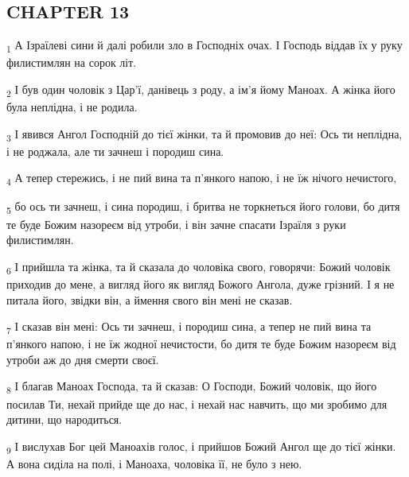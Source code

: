\subsection{CHAPTER 13}
\begin{tcolorbox}
\textsubscript{1} А Ізраїлеві сини й далі робили зло в Господніх очах. І Господь віддав їх у руку филистимлян на сорок літ.
\end{tcolorbox}
\begin{tcolorbox}
\textsubscript{2} І був один чоловік з Цар'ї, данівець з роду, а ім'я йому Маноах. А жінка його була неплідна, і не родила.
\end{tcolorbox}
\begin{tcolorbox}
\textsubscript{3} І явився Ангол Господній до тієї жінки, та й промовив до неї: Ось ти неплідна, і не роджала, але ти зачнеш і породиш сина.
\end{tcolorbox}
\begin{tcolorbox}
\textsubscript{4} А тепер стережись, і не пий вина та п'янкого напою, і не їж нічого нечистого,
\end{tcolorbox}
\begin{tcolorbox}
\textsubscript{5} бо ось ти зачнеш, і сина породиш, і бритва не торкнеться його голови, бо дитя те буде Божим назореєм від утроби, і він зачне спасати Ізраїля з руки филистимлян.
\end{tcolorbox}
\begin{tcolorbox}
\textsubscript{6} І прийшла та жінка, та й сказала до чоловіка свого, говорячи: Божий чоловік приходив до мене, а вигляд його як вигляд Божого Ангола, дуже грізний. І я не питала його, звідки він, а ймення свого він мені не сказав.
\end{tcolorbox}
\begin{tcolorbox}
\textsubscript{7} І сказав він мені: Ось ти зачнеш, і породиш сина, а тепер не пий вина та п'янкого напою, і не їж жодної нечистости, бо дитя те буде Божим назореєм від утроби аж до дня смерти своєї.
\end{tcolorbox}
\begin{tcolorbox}
\textsubscript{8} І благав Маноах Господа, та й сказав: О Господи, Божий чоловік, що його посилав Ти, нехай прийде ще до нас, і нехай нас навчить, що ми зробимо для дитини, що народиться.
\end{tcolorbox}
\begin{tcolorbox}
\textsubscript{9} І вислухав Бог цей Маноахів голос, і прийшов Божий Ангол ще до тієї жінки. А вона сиділа на полі, і Маноаха, чоловіка її, не було з нею.
\end{tcolorbox}
